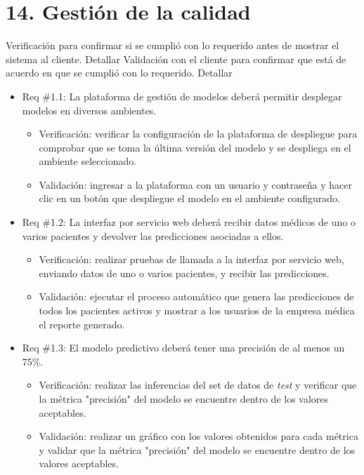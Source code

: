 \documentclass[
11pt, %
]{charter}
\begin{document}
\section{14. Gestión de la calidad}
\label{sec:calidad}

 Verificación para confirmar si se cumplió con lo requerido antes de mostrar el sistema al cliente. Detallar 
 Validación con el cliente para confirmar que está de acuerdo en que se cumplió con lo requerido. Detallar  


\begin{itemize}
	\item Req \#1.1: La plataforma de gestión de modelos deberá permitir desplegar modelos en diversos ambientes.
	\begin{itemize}
		\item Verificación: verificar la configuración de la plataforma de despliegue para comprobar que se toma la última versión del modelo y se despliega en el ambiente seleccionado.
		\item Validación: ingresar a la plataforma con un usuario y contraseña y hacer clic en un botón que despliegue el modelo en el ambiente configurado. 
	\end{itemize}
	\item Req \#1.2: La interfaz por servicio web deberá recibir datos médicos de uno o varios pacientes y devolver las predicciones asociadas a ellos.	
	\begin{itemize}
		\item Verificación: realizar pruebas de llamada a la interfaz por servicio web, enviando datos de uno o varios pacientes, y recibir las predicciones.
		\item Validación: ejecutar el proceso automático que genera las predicciones de todos los pacientes activos y mostrar a los usuarios de la empresa médica el reporte generado.
	\end{itemize}			
	\item Req \#1.3: El modelo predictivo deberá tener una precisión de al menos un 75\%.
	\begin{itemize}
		\item Verificación: realizar las inferencias del set de datos de \textit{test} y verificar que la métrica "precisión" del modelo se encuentre dentro de los valores aceptables.
		\item Validación: realizar un gráfico con los valores obtenidos para cada métrica y validar que la métrica "precisión" del modelo se encuentre dentro de los valores aceptables.
	\end{itemize}

\end{itemize}
\end{document}
